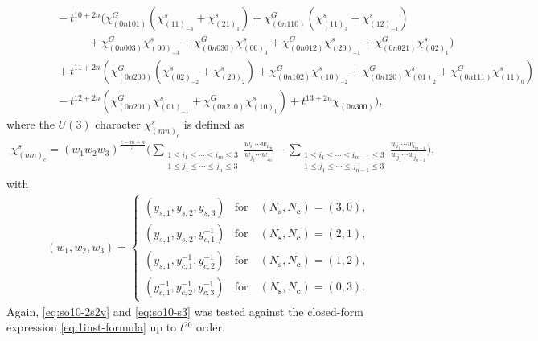 \documentclass[letterpaper, 11pt]{article}
\newcommand{\nn}{\nonumber}
\begin{document}
{\begin{align}
&\qquad \quad \ -t^{10+2n}(\chi^G_{(0n101)}(\chi^s_{(11)_{-3}}+\chi^s_{(21)_1})+\chi^G_{(0n110)}(\chi^s_{(11)_3}+\chi^s_{(12)_{-1}})\nn\\
& \qquad \qquad\qquad+\chi^G_{(0n003)}\chi^s_{(00)_{-3}}+\chi^G_{(0n030)}\chi^s_{(00)_3}+\chi^G_{(0n012)}\chi^s_{(20)_{-1}}+\chi^G_{(0n021)}\chi^s_{(02)_1})\nn\\
&\qquad \quad \ +t^{11+2n}(\chi^G_{(0n200)}(\chi^s_{(02)_{-2}}+\chi^s_{(20)_2})+\chi^G_{(0n102)}\chi^s_{(10)_{-2}}+\chi^G_{(0n120)}\chi^s_{(01)_2}+\chi^G_{(0n111)}\chi^s_{(11)_0})\nn\\
&\qquad \quad \ -t^{12+2n}(\chi^G_{(0n201)}\chi^s_{(01)_{-1}}+\chi^G_{(0n210)}\chi^s_{(10)_1})+t^{13+2n}\chi_{(0n300)}\Big),\nn
\end{align}
where the $U(3)$ character $\chi^s_{(mn)_c}$ is defined as
\begin{align}
  \label{eq:u3-flavor-char}
  \chi^s_{(mn)_c} =
    (w_1 w_2w_3)^{\frac{c-m+n}{3}}\bigg( \sum_{\substack{1\leq i_1\leq\cdots\leq i_m\leq3\\1\leq j_1\leq\cdots\leq j_n\leq 3}}\frac{w_{i_1}\cdots w_{i_m}}{w_{j_1}\cdots w_{j_n}}-\sum_{\substack{1\leq i_1\leq\cdots\leq i_{m-1}\leq3\\1\leq j_1\leq\cdots\leq j_{n-1}\leq 3}}\frac{w_{i_1}\cdots w_{i_{m-1}}}{w_{j_1}\cdots w_{j_{n-1}}}\bigg),
\end{align}
with
\begin{align}
(w_1,w_2,w_3)=
\begin{cases}
(y_{s,1},y_{s,2},y_{s,3}) & \text{for}\quad (N_\mathbf{s}, N_\mathbf{c})=(3,0),\\
(y_{s,1},y_{s,2},y_{c,1}^{-1}) & \text{for}\quad (N_\mathbf{s}, N_\mathbf{c})=(2,1),\\
(y_{s,1},y_{c,1}^{-1},y_{c,2}^{-1}) & \text{for}\quad (N_\mathbf{s}, N_\mathbf{c})=(1,2),\\
(y_{c,1}^{-1},y_{c,2}^{-1},y_{c,3}^{-1}) & \text{for}\quad (N_\mathbf{s}, N_\mathbf{c})=(0,3).
\end{cases}
\end{align}
Again, \eqref{eq:so10-2s2v} and \eqref{eq:so10-s3} was tested against the closed-form expression \eqref{eq:1inst-formula} up to $t^{20}$ order.


}
\end{document}
